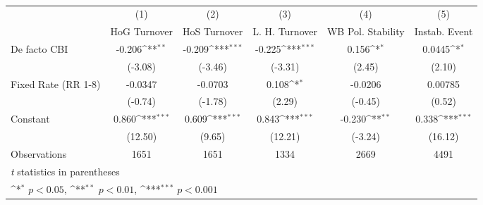 \begin{table}[htbp]\centering
\def\sym#1{\ifmmode^{#1}\else\(^{#1}\)\fi}
\caption{\label{binaryIndOLSDF}}
\begin{tabular}{l*{5}{c}}
\toprule
                                        &\multicolumn{1}{c}{(1)}&\multicolumn{1}{c}{(2)}&\multicolumn{1}{c}{(3)}&\multicolumn{1}{c}{(4)}&\multicolumn{1}{c}{(5)}\\
                                        &\multicolumn{1}{c}{HoG Turnover}&\multicolumn{1}{c}{HoS Turnover}&\multicolumn{1}{c}{L. H. Turnover}&\multicolumn{1}{c}{WB Pol. Stability}&\multicolumn{1}{c}{Instab. Event}\\
\midrule
De facto CBI                            &   -0.206\sym{**} &   -0.209\sym{***}&   -0.225\sym{***}&    0.156\sym{*}  &   0.0445\sym{*}  \\
                                        &  (-3.08)         &  (-3.46)         &  (-3.31)         &   (2.45)         &   (2.10)         \\
\addlinespace
Fixed Rate (RR 1-8)                     &  -0.0347         &  -0.0703         &    0.108\sym{*}  &  -0.0206         &  0.00785         \\
                                        &  (-0.74)         &  (-1.78)         &   (2.29)         &  (-0.45)         &   (0.52)         \\
\addlinespace
Constant                                &    0.860\sym{***}&    0.609\sym{***}&    0.843\sym{***}&   -0.230\sym{**} &    0.338\sym{***}\\
                                        &  (12.50)         &   (9.65)         &  (12.21)         &  (-3.24)         &  (16.12)         \\
\midrule
Observations                            &     1651         &     1651         &     1334         &     2669         &     4491         \\
\bottomrule
\multicolumn{6}{l}{\footnotesize \textit{t} statistics in parentheses}\\
\multicolumn{6}{l}{\footnotesize \sym{*} \(p<0.05\), \sym{**} \(p<0.01\), \sym{***} \(p<0.001\)}\\
\end{tabular}
\end{table}
